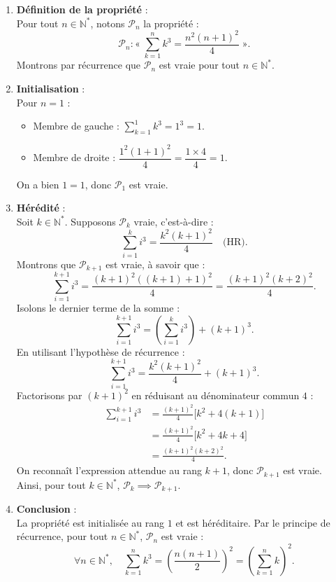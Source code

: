 \documentclass[11pt,a4paper]{article}
\newcommand{\N}{\mathbb{N}}
\begin{document}
\begin{correctionbox}
\begin{enumerate}[label=\textbf{\arabic*.}]
    \item \textbf{Définition de la propriété} :\\
    Pour tout $n \in \N^*$, notons $\mathcal{P}_n$ la propriété :
    \[
    \mathcal{P}_n : « \; \sum_{k=1}^n k^3 = \frac{n^2(n+1)^2}{4} \; ».
    \]
    Montrons par récurrence que $\mathcal{P}_n$ est vraie pour tout $n \in \N^*$.

    \item \textbf{Initialisation} :\\
    Pour $n = 1$ :
    \begin{itemize}
        \item Membre de gauche : $\sum_{k=1}^1 k^3 = 1^3 = 1$.
        \item Membre de droite : $\dfrac{1^2 (1+1)^2}{4} = \dfrac{1 \times 4}{4} = 1$.
    \end{itemize}
    On a bien $1 = 1$, donc $\mathcal{P}_1$ est vraie.

    \item \textbf{Hérédité} :\\
    Soit $k \in \N^*$. Supposons $\mathcal{P}_k$ vraie, c'est-à-dire :
    \[
    \sum_{i=1}^k i^3 = \frac{k^2(k+1)^2}{4} \quad \text{(HR)}.
    \]
    Montrons que $\mathcal{P}_{k+1}$ est vraie, à savoir que :
    \[
    \sum_{i=1}^{k+1} i^3 = \frac{(k+1)^2 ((k+1)+1)^2}{4} = \frac{(k+1)^2(k+2)^2}{4}.
    \]
    Isolons le dernier terme de la somme :
    \[
    \sum_{i=1}^{k+1} i^3 = \left(\sum_{i=1}^k i^3\right) + (k+1)^3.
    \]
    En utilisant l'hypothèse de récurrence :
    \[
    \sum_{i=1}^{k+1} i^3 = \frac{k^2(k+1)^2}{4} + (k+1)^3.
    \]
    Factorisons par $(k+1)^2$ en réduisant au dénominateur commun $4$ :
    \begin{align*}
    \sum_{i=1}^{k+1} i^3 &= \frac{(k+1)^2}{4} \Big[ k^2 + 4(k+1) \Big] \\
                         &= \frac{(k+1)^2}{4} \Big[ k^2 + 4k + 4 \Big] \\
                         &= \frac{(k+1)^2(k+2)^2}{4}.
    \end{align*}
    On reconnaît l'expression attendue au rang $k+1$, donc $\mathcal{P}_{k+1}$ est vraie.\\
    Ainsi, pour tout $k \in \N^*$, $\mathcal{P}_k \implies \mathcal{P}_{k+1}$.

    \item \textbf{Conclusion} :\\
    La propriété est initialisée au rang $1$ et est héréditaire. Par le principe de récurrence, pour tout $n \in \N^*$, $\mathcal{P}_n$ est vraie :
    \[
    \forall n \in \N^*, \quad \sum_{k=1}^n k^3 = \left(\frac{n(n+1)}{2}\right)^2 = \left(\sum_{k=1}^n k\right)^2.
    \]
\end{enumerate}
\end{correctionbox}
\end{document}
